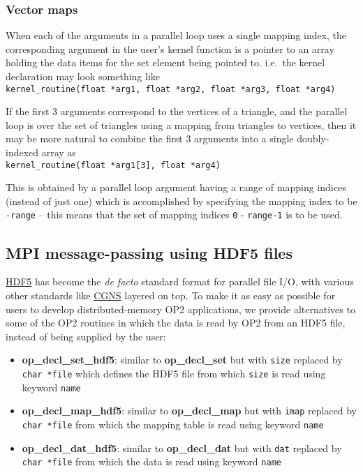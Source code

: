 \documentclass[11pt]{article}
\begin{document}
\subsubsection{Vector maps}

When each of the arguments in a parallel loop uses a single
mapping index, the corresponding argument in the user's kernel
function is a pointer to an array holding the data items for
the set element being pointed to. i.e.~the kernel declaration
may look something like\\
{\tt kernel\_routine(float *arg1, float *arg2, float *arg3, float *arg4)}

If the first 3 arguments correspond to the vertices of a triangle,
and the parallel loop is over the set of triangles using a mapping
from triangles to vertices, then it may be more natural to combine
the first 3 arguments into a single doubly-indexed array as\\
{\tt kernel\_routine(float *arg1[3], float *arg4)}

This is obtained by a parallel loop argument having a range of mapping
indices (instead of just one) which is accomplished by specifying the
mapping index to be {\tt -range} -- this means that the set of mapping
indices {\tt 0} - {\tt range-1} is to be used.

\newpage

\subsection{MPI message-passing using HDF5 files}

\href{http://www.hdfgroup.org/HDF5/}{HDF5}
has become the {\it de facto} standard format for parallel file I/O,
with various other standards like
\href{http://cgns.sourceforge.net/hdf5.html}{CGNS}
layered on top.
To make it as easy as possible for users to develop distributed-memory
OP2 applications, we provide alternatives to some of the OP2 routines
in which the data is read by OP2 from an HDF5 file, instead of being
supplied by the user:
\begin{itemize}
\item {\bf op\_decl\_set\_hdf5}: similar to {\bf op\_decl\_set} but with {\tt size}
replaced by {\tt char *file} which defines the HDF5 file from which {\tt size}
is read using keyword {\tt name}

\item {\bf op\_decl\_map\_hdf5}: similar to {\bf op\_decl\_map} but with {\tt imap}
replaced by {\tt char *file} from which the mapping table is read using keyword {\tt name}

\item {\bf op\_decl\_dat\_hdf5}: similar to {\bf op\_decl\_dat} but with {\tt dat}
replaced by {\tt char *file} from which the data is read using keyword {\tt name}
\end{itemize}
\end{document}
